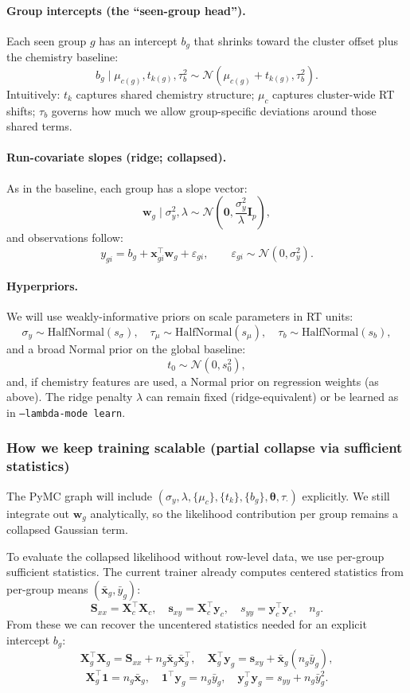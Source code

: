 \documentclass[11pt]{article}
\begin{document}
\paragraph{Group intercepts (the ``seen-group head'').}
Each seen group $g$ has an intercept $b_g$ that shrinks toward the cluster offset plus the chemistry baseline:
\[
  b_g \mid \mu_{c(g)}, t_{k(g)}, \tau_b^2 \sim \mathcal{N}\!\left(\mu_{c(g)} + t_{k(g)}, \tau_b^2\right).
\]
Intuitively: $t_k$ captures shared chemistry structure; $\mu_c$ captures cluster-wide RT shifts; $\tau_b$ governs how much we allow
group-specific deviations around those shared terms.

\paragraph{Run-covariate slopes (ridge; collapsed).}
As in the baseline, each group has a slope vector:
\[
  \bm{w}_g \mid \sigma_y^2, \lambda \sim \mathcal{N}\!\left(\bm{0}, \frac{\sigma_y^2}{\lambda}\bm{I}_p\right),
\]
and observations follow:
\[
  y_{gi} = b_g + \bm{x}_{gi}^\top \bm{w}_g + \varepsilon_{gi}, \qquad
  \varepsilon_{gi} \sim \mathcal{N}(0, \sigma_y^2).
\]

\paragraph{Hyperpriors.}
We will use weakly-informative priors on scale parameters in RT units:
\[
  \sigma_y \sim \mathrm{HalfNormal}(s_{\sigma}),\quad
  \tau_\mu \sim \mathrm{HalfNormal}(s_\mu),\quad
  \tau_b \sim \mathrm{HalfNormal}(s_b),
\]
and a broad Normal prior on the global baseline:
\[
  t_0 \sim \mathcal{N}(0, s_0^2),
\]
and, if chemistry features are used, a Normal prior on regression weights (as above).
The ridge penalty $\lambda$ can remain fixed (ridge-equivalent) or be learned as in \texttt{--lambda-mode learn}.

\subsubsection{How we keep training scalable (partial collapse via sufficient statistics)}

The PyMC graph will include $(\sigma_y, \lambda, \{\mu_c\}, \{t_k\}, \{b_g\}, \bm{\theta}, \tau_\cdot)$ explicitly.
We still integrate out $\bm{w}_g$ analytically, so the likelihood contribution per group remains a collapsed Gaussian term.

To evaluate the collapsed likelihood without row-level data, we use per-group sufficient statistics. The current trainer already computes
centered statistics from per-group means $(\bar{\bm{x}}_g, \bar{y}_g)$:
\[
  \bm{S}_{xx} = \bm{X}_c^\top \bm{X}_c,\quad
  \bm{s}_{xy} = \bm{X}_c^\top \bm{y}_c,\quad
  s_{yy} = \bm{y}_c^\top \bm{y}_c,\quad
  n_g.
\]
From these we can recover the uncentered statistics needed for an explicit intercept $b_g$:
\[
  \bm{X}_g^\top \bm{X}_g = \bm{S}_{xx} + n_g \bar{\bm{x}}_g \bar{\bm{x}}_g^\top,\quad
  \bm{X}_g^\top \bm{y}_g = \bm{s}_{xy} + \bar{\bm{x}}_g (n_g \bar{y}_g),
\]
\[
  \bm{X}_g^\top \bm{1} = n_g \bar{\bm{x}}_g,\quad
  \bm{1}^\top \bm{y}_g = n_g \bar{y}_g,\quad
  \bm{y}_g^\top \bm{y}_g = s_{yy} + n_g \bar{y}_g^2.
\]
\end{document}
